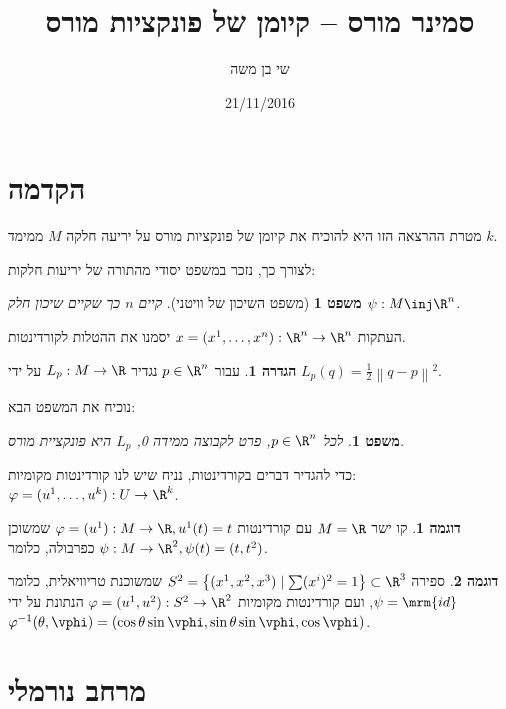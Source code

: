 \documentclass{article}
\title{סמינר מורס – קיומן של פונקציות מורס}
\author{שי בן משה}
\date{21/11/2016}
\newtheorem{theorem}{משפט}
\newtheorem*{theorem*}{משפט}
\theoremstyle{definition}
\newtheorem*{definition*}{הגדרה}
\newtheorem*{example*}{דוגמה}
\newcommand{\norm}[1]{\left\lVert#1\right\rVert}
\begin{document}
	\maketitle
	
	
	
	
	\section{הקדמה}
	
	מטרת ההרצאה הזו היא להוכיח את קיומן של פונקציות מורס על יריעה חלקה \(M\) ממימד \(k\).
	
	לצורך כך, נזכר במשפט יסודי מהתורה של יריעות חלקות:
	\begin{theorem*}[משפט השיכון של וויטני]
		קיים \(n\) כך שקיים שיכון חלק
		\(\psi: M \inj \R^n\).
	\end{theorem*}
	העתקות
	\(x=(x^1,\dotsc,x^n): \R^n \to \R^n\)
	יסמנו את ההטלות לקורדינטות.
	
	\begin{definition*}
		עבור
		\(p\in \R^n\)
		נגדיר
		\(L_p:M\to \R\)
		על ידי
		\(L_p(q)=\frac{1}{2}\norm{q-p}^2\).
	\end{definition*}

	נוכיח את המשפט הבא:
	\begin{theorem}\label{main-thm}
		לכל
		\(p\in \R^n\),
		פרט לקבוצה ממידה 0, \(L_p\) היא פונקציית מורס.
	\end{theorem}

	כדי להגדיר דברים בקורדינטות, נניח שיש לנו קורדינטות מקומיות:
	\(\varphi=(u^1,\dotsc,u^k): U \to \R^k\).
	
	\begin{example*}
		קו ישר
		\(M = \R\)
		עם קורדינטות
		\(\varphi=(u^1): M \to \R, u^1(t)=t\)
		שמשוכן כפרבולה, כלומר
		\(\psi: M \to \R^2, \psi(t) = (t,t^2)\).
	\end{example*}
	
	\begin{example*}
		ספירה
		\(S^2 = \left\{(x^1,x^2,x^3) \mid \sum (x^i)^2 = 1 \right\} \subset \R^3 \)
		שמשוכנת טריוויאלית, כלומר
		\(\psi = \mrm{id}\),
		ועם קורדינטות מקומיות
		\(\varphi=(u^1,u^2): S^2 \to \R^2\)
		הנתונת על ידי
		\(
			\varphi^{-1}(\theta, \vphi) = \left(
				\cos\theta \sin\vphi,
				\sin\theta \sin\vphi,
				\cos\vphi
			\right)
		\).
	\end{example*}




	\section{מרחב נורמלי}
	
\end{document}
